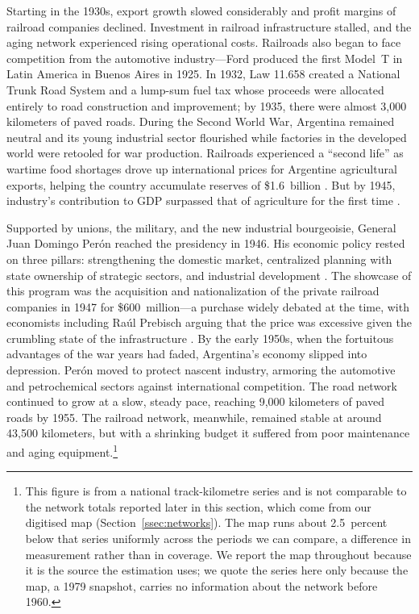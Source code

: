 Starting in the 1930s, export growth slowed considerably and profit
margins of railroad companies declined. Investment in railroad
infrastructure stalled, and the aging network experienced rising
operational costs. Railroads also began to face competition from the
automotive industry—Ford produced the first Model~T in Latin America
in Buenos Aires in 1925. In 1932, Law 11.658 created a National Trunk
Road System and a lump-sum fuel tax whose proceeds were allocated
entirely to road construction and improvement; by 1935, there were
almost 3{,}000 kilometers of paved roads. During the Second World War,
Argentina remained neutral and its young industrial sector flourished
while factories in the developed world were retooled for war
production. Railroads experienced a ``second life'' as wartime food
shortages drove up international prices for Argentine agricultural
exports, helping the country accumulate reserves of \$1.6~billion
\citep{whitaker1954}. But by 1945, industry's contribution to GDP
surpassed that of agriculture for the first time \citep{potash1969}.

Supported by unions, the military, and the new industrial
bourgeoisie, General Juan Domingo Perón reached the presidency in
1946. His economic policy rested on three pillars: strengthening the
domestic market, centralized planning with state ownership of
strategic sectors, and industrial development
\citep{whitaker1954, pahowka2005}. The showcase of this program was
the acquisition and nationalization of the private railroad companies
in 1947 for \$600~million—a purchase widely debated at the time, with
economists including Raúl Prebisch arguing that the price was
excessive given the crumbling state of the infrastructure
\citep{rock1987}. By the early 1950s, when the fortuitous advantages
of the war years had faded, Argentina's economy slipped into
depression. Perón moved to protect nascent industry, armoring the
automotive and petrochemical sectors against international
competition. The road network continued to grow at a slow, steady
pace, reaching 9{,}000 kilometers of paved roads by 1955. The railroad
network, meanwhile, remained stable at around 43{,}500 kilometers, but
with a shrinking budget it suffered from poor maintenance and aging
equipment.\footnote{This figure is from a national track-kilometre
series and is not comparable to the network totals reported later in
this section, which come from our digitised map
(Section~\ref{ssec:networks}). The map runs about 2.5~percent below that
series uniformly across the periods we can compare, a difference in
measurement rather than in coverage. We report the map throughout
because it is the source the estimation uses; we quote the series here
only because the map, a 1979 snapshot, carries no information about the
network before 1960.}


